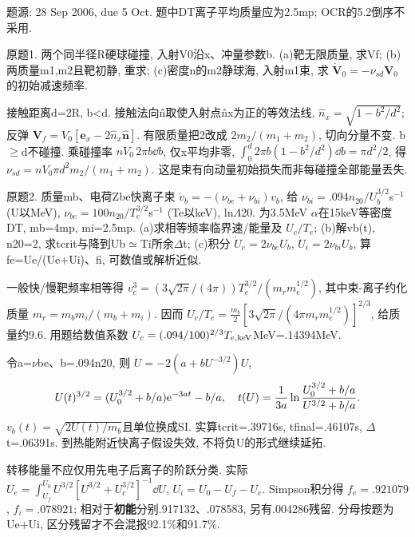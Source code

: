 题源: 28 Sep 2006, due 5 Oct. 题中DT离子平均质量应为2.5mp; OCR的5.2倒序不采用.
\begin{exercise}\label{ex:06-3-1}
原题1. 两个同半径R硬球碰撞, 入射V0沿x、冲量参数b. (a)靶无限质量, 求Vf; (b)两质量m1,m2且靶初静, 重求; (c)密度n的m2静球海, 入射m1束, 求 $\dot{\mathbf V}_0=-\nu_{sd}\mathbf V_0$ 的初始减速频率.
\end{exercise}
\begin{solution}
接触距离d=2R, b<d. 接触法向n̂取使入射点n̂x为正的等效法线, $\hat n_x=\sqrt{1-b^2/d^2}$; 反弹 $\mathbf V_f=V_0[\mathbf e_x-2\hat n_x\hat{\mathbf n}]$. 有限质量把2改成 $2m_2/(m_1+m_2)$, 切向分量不变. b\ensuremath{\ge}d不碰撞. 乘碰撞率 $nV_0\,2\pi b\dd b$, 仅x平均非零, $\int_0^d2\pi b(1-b^2/d^2)\dd b=\pi d^2/2$, 得 $\nu_{sd}=nV_0\pi d^2m_2/(m_1+m_2)$. 这是束有向动量初始损失而非每碰撞全部能量丢失.
\end{solution}
\begin{exercise}\label{ex:06-3-2}
原题2. 质量mb、电荷Zbe快离子束 $\dot v_b=-(\nu_{be}+\nu_{bi})v_b$, 给 $\nu_{bi}=.094n_{20}/U_b^{3/2}$s$^{-1}$ (U以MeV), $\nu_{be}=100n_{20}/T_e^{3/2}$s$^{-1}$ (Te以keV), ln\ensuremath{\Lambda}20. 为3.5MeV \ensuremath{\alpha}在15keV等密度DT, mb=4mp, mi=2.5mp. (a)求相等频率临界速/能量及 $U_c/T_e$; (b)解vb(t), n20=2, 求tcrit与降到Ub\ensuremath{\simeq}Ti所余\ensuremath{\Delta}t; (c)积分 $\dot U_e=2\nu_{be}U_b$, $\dot U_i=2\nu_{bi}U_b$, 算fe=Ue/(Ue+Ui)、fi, 可数值或解析近似.
\end{exercise}
\begin{solution}
一般快/慢靶频率相等得 $v_c^3=(3\sqrt{2\pi}/(4\pi))T_e^{3/2}/(m_rm_e^{1/2})$, 其中束-离子约化质量 $m_r=m_bm_i/(m_b+m_i)$. 因而 $U_c/T_e=\tfrac{m_b}{2}[3\sqrt{2\pi}/(4\pi m_rm_e^{1/2})]^{2/3}$, 给质量约9.6. 用题给数值系数 $U_c=(.094/100)^{2/3}T_{e,\rm keV}$MeV=.14394MeV.

令a=\ensuremath{\nu}be、b=.094n20, 则 $\dot U=-2(a+bU^{-3/2})U$,
\begin{equation}
 U(t)^{3/2}=(U_0^{3/2}+b/a)\mathrm e^{-3at}-b/a,\quad
 t(U)=\frac1{3a}\ln\frac{U_0^{3/2}+b/a}{U^{3/2}+b/a}.
\end{equation}
$v_b(t)=\sqrt{2U(t)/m_b}$且单位换成SI. 实算tcrit=.39716s, tfinal=.46107s, \ensuremath{\Delta}t=.06391s. 到热能附近快离子假设失效, 不将负U的形式继续延拓.

转移能量不应仅用先电子后离子的阶跃分类. 实际 $U_e=\int_{U_f}^{U_0}U^{3/2}[U^{3/2}+U_c^{3/2}]^{-1}\dd U$, $U_i=U_0-U_f-U_e$. Simpson积分得 $f_e=.921079$, $f_i=.078921$; 相对于\textbf{初能}分别.917132、.078583, 另有.004286残留. 分母按题为Ue+Ui, 区分残留才不会混报92.1\%和91.7\%.
\end{solution}
